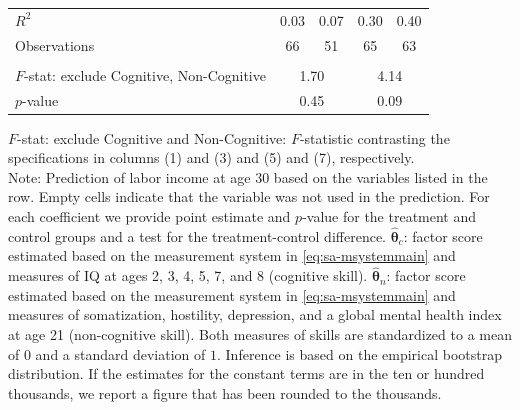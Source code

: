 \documentclass[static]{JJH-Beamer}
\begin{document}
\begin{frame}
\begin{table}[H]
\begin{center}
{\begin{tabular}{lcccccccc}
$R^2$ &         \multicolumn{2}{c}{0.03} &              \multicolumn{2}{c}{0.07} &             \multicolumn{2}{c}{0.30} &               \multicolumn{2}{c}{0.40}  \\
Observations &         \multicolumn{2}{c}{66} &          \multicolumn{2}{c}{51} &              \multicolumn{2}{c}{65} &             \multicolumn{2}{c}{63}  \\  \\ \midrule
$F$-stat: exclude Cognitive, Non-Cognitive &              \multicolumn{4}{c}{1.70} &               \multicolumn{4}{c}{4.14}  \\
$p$-value  &         \multicolumn{4}{c}{0.45} &                   \multicolumn{4}{c}{0.09} \\
\bottomrule
\end{tabular}
}
\end{center}
\tiny \flushleft
$F$-stat: exclude Cognitive and Non-Cognitive: $F$-statistic contrasting the specifications in columns (1) and (3) and (5) and (7), respectively.\\
Note: Prediction of labor income at age 30 based on the variables listed in the row. Empty cells indicate that the variable was not used in the prediction. For each coefficient we provide point estimate and $p$-value for the treatment and control groups and a test for the treatment-control difference. $\hat{\bm{\theta}}_{c}$: factor score estimated based on the measurement system in \eqref{eq:sa-msystemmain} and measures of IQ at ages 2, 3, 4, 5, 7, and 8 (cognitive skill). $\hat{\bm{\theta}}_{n}$: factor score estimated based on the measurement system in \eqref{eq:sa-msystemmain} and measures of somatization, hostility, depression, and a global mental health index at age 21 (non-cognitive skill). Both measures of skills are standardized to a mean of $0$ and a standard deviation of $1$. Inference is based on the empirical bootstrap distribution. If the estimates for the constant terms are in the ten or hundred thousands, we report a figure that has been rounded to the thousands.\\
\end{table}

\end{frame}
\end{document}
